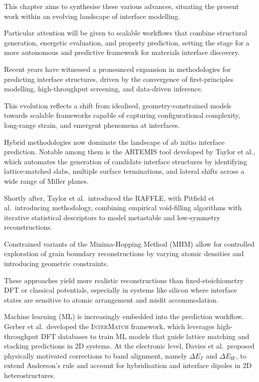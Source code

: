 
This chapter aims to synthesise these various advances, situating the present work within an evolving landscape of
interface modelling.

Particular attention will be given to scalable workflows that combine structural generation, energetic evaluation, and
property prediction, setting the stage for a more autonomous and predictive framework for materials interface discovery.


Recent years have witnessed a pronounced expansion in methodologies for predicting interface structures, driven by the
convergence of first-principles modelling, high-throughput screening, and data-driven inference.


This evolution reflects a shift from idealised, geometry-constrained models towards scalable frameworks capable of
capturing configurational complexity, long-range strain, and emergent phenomena at interfaces.


Hybrid methodologies now dominate the landscape of ab initio interface prediction. Notable among them is the
\textsc{ARTEMIS} tool developed by Taylor et al., which automates the generation of candidate interface structures by
identifying lattice-matched slabs, multiple surface terminations, and lateral shifts across a wide range of Miller
planes.


Shortly after, Taylor et al.\ introduced the \textsc{RAFFLE}, with Pitfield et al.\ introducing methodology, combining
empirical void-filling algorithms with iterative statistical descriptors to model metastable and low-symmetry
reconstructions.


Constrained variants of the Minima-Hopping Method (MHM) allow for controlled exploration of grain boundary
reconstructions by varying atomic densities and introducing geometric constraints.

These approaches yield more realistic reconstructions than fixed-stoichiometry DFT or classical potentials, especially
in systems like silicon where interface states are sensitive to atomic arrangement and misfit accommodation.


Machine learning (ML) is increasingly embedded into the prediction workflow. Gerber et al.\ developed the
\textsc{InterMatch} framework, which leverages high-throughput DFT databases to train ML models that guide lattice
matching and stacking predictions in 2D systems. At the electronic level, Davies et al.\ proposed physically motivated
corrections to band alignment, namely $\Delta E_\Gamma$ and $\Delta E_{\mathrm{IF}}$, to extend Anderson's rule and
account for hybridisation and interface dipoles in 2D heterostructures.

